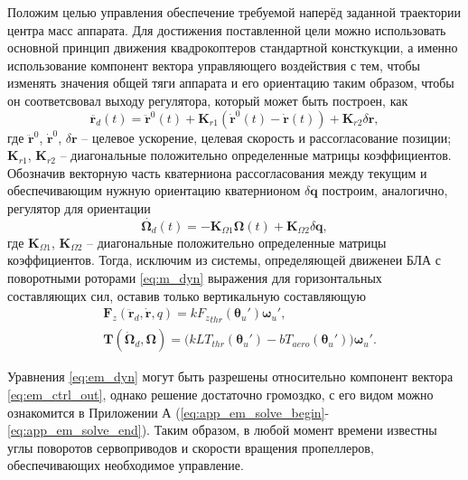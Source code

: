 Положим целью управления обеспечение требуемой наперёд заданной траектории центра масс аппарата.
Для достижения поставленной цели можно использовать основной принцип движения квадрокоптеров стандартной консткукции, а именно использование компонент вектора управляющего воздействия с тем, чтобы изменять значения общей тяги аппарата и его ориентацию таким образом, чтобы он соответсвовал выходу регулятора, который может быть построен, как
\begin{equation} \label{eq:em_reg_r}
\ddot{\bm{r}_d}(t)=
\ddot{\bm{r}}^0(t)+\bm{K}_{r1}(\dot{\bm{r}}^0(t)-\dot{\bm{r}}(t))+\bm{K}_{r2}\delta \bm r,
\end{equation}
где 
$\ddot{\bm{r}}^0$, $\dot{\bm{r}}^0$, $\delta \bm r$ -- целевое ускорение, целевая скорость и рассогласование позиции;
$\bm K_{r1}$, $\bm K_{r2}$ 
-- диагональные положительно определенные матрицы коэффициентов.
Обозначив векторную часть кватерниона рассогласования между текущим и обеспечивающим нужную ориентацию кватернионом
$\delta \bm q$
построим, аналогично, регулятор для ориентации
\begin{equation} \label{eq:em_reg_q}
\dot{\bm{\Omega}_d}(t)=
-\bm{K}_{\Omega1}\bm{\Omega}(t)+\bm{K}_{\Omega2}\delta\bm{q},
\end{equation}
где $\bm K_{\Omega1}$, $\bm K_{\Omega2}$ 
-- диагональные положительно определенные матрицы коэффициентов.
Тогда, исключим из системы, определяющей движенеи БЛА с поворотными роторами \eqref{eq:m_dyn} выражения для горизонтальных составляющих сил, оставив только вертикальную составляющую
\begin{equation} \label{eq:em_dyn}
\begin{aligned}
&\bm F_z(\ddot{\bm r}_d, \dot{\bm r}, q) = k {F_z}_{thr} (\bm \theta_u') \bm \omega_u',\\
&\bm T(\dot{\bm \Omega}_d, \bm\Omega) = \Big(
kLT_{thr}(\bm\theta_u') - bT_{aero}(\bm\theta_u')
\Big)
\bm \omega_u'.
\end{aligned}
\end{equation}

Уравнения \eqref{eq:em_dyn} могут быть разрешены относительно компонент вектора \eqref{eq:em_ctrl_out}, однако решение достаточно громоздко, с его видом можно ознакомится в Приложении А (\ref{eq:app_em_solve_begin}-\ref{eq:app_em_solve_end}).  Таким образом, в любой момент времени известны углы поворотов сервоприводов и скорости вращения пропеллеров, обеспечивающих необходимое управление.

